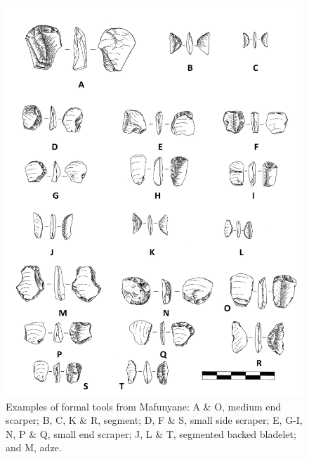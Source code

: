	\begin{figure} %
		\includegraphics[width=\linewidth]{figures/Forssman-Figure05}
		\caption{Examples of formal tools from Mafunyane: A \& O, medium end scarper; B, C, K \& R, segment; D, F \& S, small side scraper; E, G-I, N, P \& Q, small end scraper; J, L \& T, segmented backed bladelet; and M, adze.}
		\label{fig:Forssman-Figure05}
	\end{figure}
	
